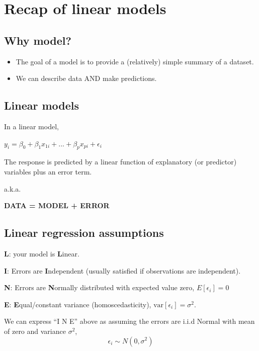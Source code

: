 \documentclass[
  openany]{book}
\providecommand{\tightlist}{%
  \setlength{\itemsep}{0pt}\setlength{\parskip}{0pt}}
\begin{document}
\hypertarget{recap-of-linear-models}{%
\section{Recap of linear models}\label{recap-of-linear-models}}

\hypertarget{why-model}{%
\subsection{Why model?}\label{why-model}}

\begin{itemize}
\tightlist
\item
  The goal of a model is to provide a (relatively) simple summary of a dataset.
\item
  We can describe data AND make predictions.
\end{itemize}

\hypertarget{linear-models}{%
\subsection{Linear models}\label{linear-models}}

In a linear model,

\(y_i = \beta_0 + \beta_1x_{1i} + ... + \beta_px_{pi} + \epsilon_i\)

The response is predicted by a linear function of
explanatory (or predictor) variables plus an error term.

a.k.a.

\textbf{DATA = MODEL + ERROR}

\hypertarget{linear-regression-assumptions}{%
\subsection{Linear regression assumptions}\label{linear-regression-assumptions}}

\textbf{L}: your model is \textbf{L}inear.

\textbf{I}: Errors are \textbf{I}ndependent (usually satisfied if observations are independent).

\textbf{N}: Errors are \textbf{N}ormally distributed with expected value zero, \(E[\epsilon_i]=0\)

\textbf{E}: \textbf{E}qual/constant variance (homoscedasticity), \(\text{var}[\epsilon_i] = \sigma^2\).

We can express ``I N E'' above as assuming the errors are i.i.d Normal with mean of zero and variance \(\sigma^2\),
\[\epsilon_i \sim N(0, \sigma^2)\]
\end{document}
